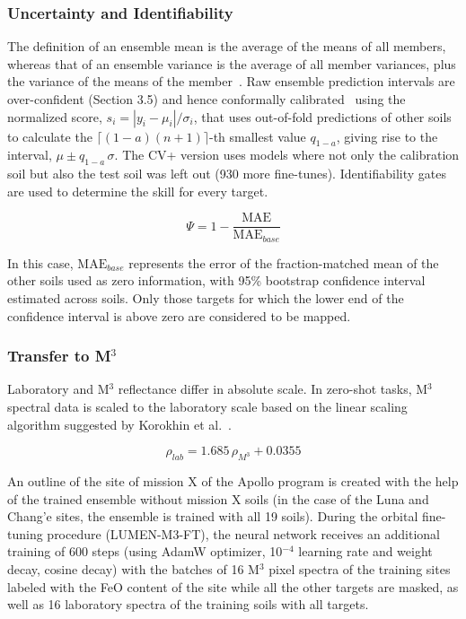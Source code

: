 \documentclass[remotesensing,article,submit,pdftex,moreauthors]{Definitions/mdpi}
\begin{document}
\subsubsection{Uncertainty and Identifiability}

The definition of an ensemble mean is the average of the means of all members, whereas that of an ensemble variance is the average of all member variances, plus the variance of the means of the member~\cite{lakshminarayanan2017}. Raw ensemble prediction intervals are over-confident (Section 3.5) and hence conformally calibrated~\cite{barber2021} using the normalized score, $s_i = |y_i - \mu_i|/\sigma_i$, that uses out-of-fold predictions of other soils to calculate the $\lceil (1-a)(n+1)\rceil$-th smallest value $q_{1-a}$, giving rise to the interval, $\mu \pm q_{1-a}\,\sigma$. The CV+ version uses models where not only the calibration soil but also the test soil was left out (930 more fine-tunes). Identifiability gates are used to determine the skill for every target.

\begin{equation}
\Psi = 1 - \frac{\mathrm{MAE}}{\mathrm{MAE}_{base}}
\label{eq9}
\end{equation}

In this case, $\mathrm{MAE}_{base}$ represents the error of the fraction-matched mean of the other soils used as zero information, with 95\% bootstrap confidence interval estimated across soils. Only those targets for which the lower end of the confidence interval is above zero are considered to be mapped.

\subsubsection{Transfer to M$^{3}$}

Laboratory and M$^{3}$ reflectance differ in absolute scale. In zero-shot tasks, M$^{3}$ spectral data is scaled to the laboratory scale based on the linear scaling algorithm suggested by Korokhin et al.~\cite{korokhin2024}.

\begin{equation}
\rho_{lab} = 1.685\,\rho_{M^3} + 0.0355
\label{eq10}
\end{equation}

An outline of the site of mission X of the Apollo program is created with the help of the trained ensemble without mission X soils (in the case of the Luna and Chang'e sites, the ensemble is trained with all 19 soils). During the orbital fine-tuning procedure (LUMEN-M3-FT), the neural network receives an additional training of 600 steps (using AdamW optimizer, 10$^{-4}$ learning rate and weight decay, cosine decay) with the batches of 16 M$^{3}$ pixel spectra of the training sites labeled with the FeO content of the site while all the other targets are masked, as well as 16 laboratory spectra of the training soils with all targets.
\end{document}

